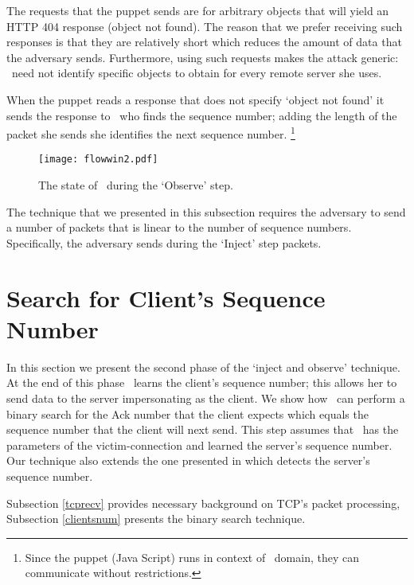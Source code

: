 \documentclass[conference]{IEEEtran}
\newcommand{\wnd}{}
\begin{document}
The requests that the puppet sends are for arbitrary objects that will yield an HTTP 404 response (object not found). The reason that we prefer receiving such responses is that they are relatively short which reduces the amount of data that the adversary sends. Furthermore, using such requests makes the attack generic: \mal\ need not identify specific objects to obtain for every remote server she uses.

When the puppet reads a response that does not specify `object not found' it sends the response to \mal\ who finds the sequence number; adding the length of the packet she sends she identifies the next sequence number. \footnote{Since the puppet (Java Script) runs in context of \mal\ domain, they can communicate without restrictions.}

\begin{figure}
  \begin{center}
    \texttt{[image: flowwin2.pdf]}
  \end{center}
  \caption{The state of \wnd\ during the `Observe' step.}
    \label{fig:flowcontrolwin2}
\end{figure}

The technique that we presented in this subsection requires the adversary to send a number of packets that is linear to the number of sequence numbers. Specifically, the adversary sends during the `Inject' step  packets.











\section{Search for Client's Sequence Number}\label{Injection:AckEsposure}
In this section we present the second phase of the `inject and observe' technique. At the end of this phase \mal\ learns the client's sequence number; this allows her to send data to the server impersonating as the client. We show how \mal\ can perform a binary search for the Ack number that the client expects which equals the sequence number that the client will next send. This step assumes that \mal\ has the parameters of the victim-connection and learned the server's sequence number. Our technique also extends the one presented in \cite{snptcp} which detects the server's sequence number.


Subsection \ref{tcprecv} provides necessary background on TCP's packet processing, Subsection \ref{clientsnum} presents the binary search technique.
\end{document}

